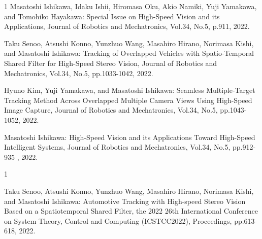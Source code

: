 \begin{雑誌論文}{1}
Masatoshi Ishikawa, Idaku Ishii, Hiromasa Oku, Akio Namiki, Yuji Yamakawa, and Tomohiko Hayakawa: Special Issue on High-Speed Vision and its Applications, Journal of Robotics and Mechatronics, Vol.34, No.5, p.911, 2022.

Taku Senoo, Atsushi Konno, Yunzhuo Wang, Masahiro Hirano, Norimasa Kishi, and Masatoshi Ishikawa: Tracking of Overlapped Vehicles with Spatio-Temporal Shared Filter for High-Speed Stereo Vision, Journal of Robotics and Mechatronics, Vol.34, No.5, pp.1033-1042, 2022.

Hyuno Kim, Yuji Yamakawa, and Masatoshi Ishikawa: Seamless Multiple-Target Tracking Method Across Overlapped Multiple Camera Views Using High-Speed Image Capture, Journal of Robotics and Mechatronics, Vol.34, No.5, pp.1043-1052, 2022.

Masatoshi Ishikawa: High-Speed Vision and its Applications Toward High-Speed Intelligent Systems, Journal of Robotics and Mechatronics, Vol.34, No.5, pp.912-935 , 2022.

\end{雑誌論文}

\begin{発表}{1}

Taku Senoo, Atsushi Konno, Yunzhuo Wang, Masahiro Hirano, Norimasa Kishi, and Masatoshi Ishikawa: Automotive Tracking with High-speed Stereo Vision Based on a Spatiotemporal Shared Filter, the 2022 26th International Conference on System Theory, Control and Computing (ICSTCC2022), Proceedings, pp.613-618, 2022.

\end{発表}
